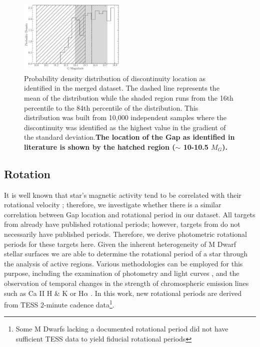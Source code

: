 \begin{figure}
  \centering
  \includegraphics[width=0.45\textwidth]{figures/GapLocationMC.pdf}
  \caption{Probability density distribution of discontinuity location as
  identified in the merged dataset. The dashed line represents the mean of the
  distribution while the shaded region runs from the 16th percentile to the
  84th percentile of the distribution. This distribution was built from 10,000
  independent samples where the discontinuity was identified as the highest
  value in the gradient of the standard deviation.\textbf{The location of the Gap
  as identified in literature is shown by the hatched region ($\sim$ 10-10.5 $M_{G}$).}}
  \label{fig:GapLocationMC}
\end{figure}

\subsection{Rotation}
It is well known that star's magnetic activity tend to be correlated with their
rotational velocity \citep{Vaughan1981, Newton2016, Astudillo-Defru2017,
Houdebine2017, Boudreaux2022}; therefore, we investigate whether there is a
similar correlation between Gap location and rotational period in our dataset.
All targets from \citet{Boudreaux2022} already have published rotational
periods; however, targets from \citet{Perdelwitz2021} do not necessarily have
published periods. Therefore, we derive photometric rotational periods for
these targets here. Given the inherent heterogeneity of M Dwarf stellar
surfaces \citep{Boisse2011, Robertson2020} we are able to determine the
rotational period of a star through the analysis of active regions. Various
methodologies can be employed for this purpose, including the examination of
photometry and light curves \citep[e.g.,][]{Newton2016}, and the observation of
temporal changes in the strength of chromospheric emission lines such as Ca II
H \& K or H$\alpha$ \citep[e.g.,][]{2019A&A...623A..24F,2023MNRAS.518.3147K}.
In this work, new rotational periods are derived from TESS 2-minute cadence
data\footnote{Some M Dwarfs lacking a documented rotational period did not have
sufficient TESS data to yield fiducial rotational periods}.

